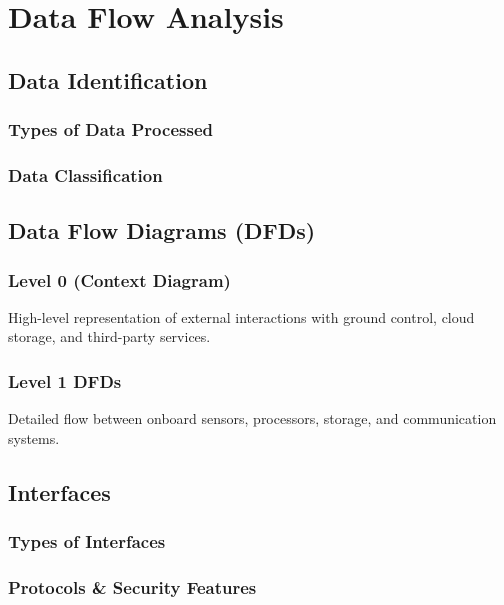 \documentclass{article}
\begin{document}
\section{Data Flow Analysis}
\subsection{Data Identification}
\subsubsection{Types of Data Processed}
\subsubsection{Data Classification}
\subsection{Data Flow Diagrams (DFDs)}
\subsubsection{Level 0 (Context Diagram)}
High-level representation of external interactions with ground control, cloud storage, and third-party services.

\subsubsection{Level 1 DFDs}
Detailed flow between onboard sensors, processors, storage, and communication systems.

\subsection{Interfaces}
\subsubsection{Types of Interfaces}
\subsubsection{Protocols \& Security Features}
\end{document}
